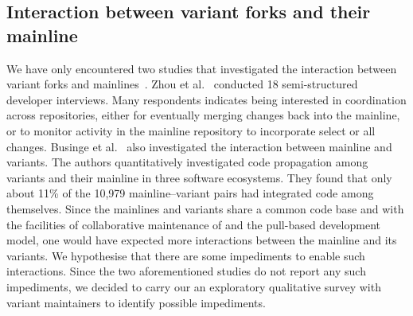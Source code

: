 \subsection{Interaction between variant forks and their mainline}
We have only encountered two studies that investigated the interaction between variant forks and mainlines~\cite{Zhou:2020,businge:emse:2021}.
Zhou et al.~\cite{Zhou:2020} conducted 18 semi-structured developer interviews. Many respondents indicates being interested in coordination across repositories, either for eventually merging changes back into the mainline, or to monitor activity in the mainline repository to incorporate select or all changes.
Businge et al.~\cite{businge:emse:2021} also  investigated the interaction between mainline and variants. The authors quantitatively investigated code propagation among variants and their mainline in three software ecosystems. They found that only about 11\% of the 10,979 mainline--variant pairs had integrated code among themselves. 
Since the mainlines and variants share a common code base and with the facilities of collaborative maintenance of \git and the pull-based development model, 
one would have expected more interactions between the mainline and its variants. We hypothesise that there are some impediments to enable such interactions. 
Since the two aforementioned studies do not report any such impediments,
we decided to carry our an exploratory qualitative survey with variant maintainers to identify possible impediments.


